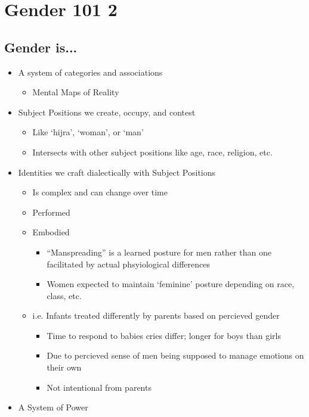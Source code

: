 \documentclass[a4paper]{article}
\begin{document}
\section{Gender 101 2} %
\subsection{Gender is...}
\begin{itemize}
  \item A system of categories and associations \begin{itemize}
    \item Mental Maps of Reality
  \end{itemize}
  \item Subject Positions we create, occupy, and contest \begin{itemize}
    \item Like `hijra', `woman', or `man'
    \item Intersects with other subject positions like age, race, religion, etc.
  \end{itemize}
  \item Identities we craft dialectically with Subject Positions \begin{itemize}
    \item Is complex and can change over time
    \item Performed
    \item Embodied \begin{itemize}
      \item ``Manspreading'' is a learned posture for men rather than one facilitated by actual phsyiological differences
      \item Women expected to maintain `feminine' posture depending on race, class, etc.
    \end{itemize}
    \item i.e. Infants treated differently by parents based on percieved gender \begin{itemize}
      \item Time to respond to babies cries differ; longer for boys than girls
      \item Due to percieved sense of men being supposed to manage emotions on their own
      \item Not intentional from parents
    \end{itemize}
  \end{itemize}
  \item A System of Power \begin{itemize}

\end{itemize}
\end{itemize}
\end{document}
